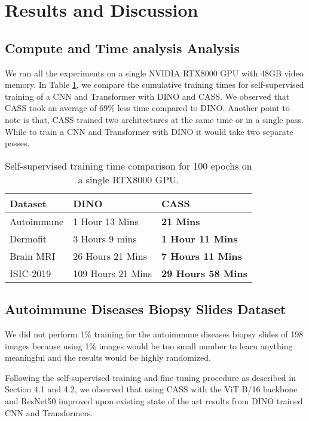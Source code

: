 \section{Results and Discussion}


\subsection{Compute and Time analysis Analysis}

We ran all the experiments on a single NVIDIA
RTX8000 GPU with 48GB video memory. In Table \ref{computetime}, we compare the cumulative training times for self-supervised training of a CNN and Transformer with DINO and CASS. We observed that CASS took an average of 69\% less time compared to DINO. Another point to note is that, CASS trained two architectures at the same time or in a single pass. While to train a CNN and Transformer with DINO it would take two separate passes.

\begin{table}[!htb]
\centering
\begin{tabular}{lll}
\hline
Dataset    & DINO              & CASS                    \\
\hline
Autoimmune & 1 Hour 13 Mins    & \textbf{21 Mins}          \\
Dermofit & 3 Hours 9 mins & \textbf{1 Hour 11 Mins} \\
Brain MRI  & 26 Hours 21 Mins  & \textbf{7 Hours 11 Mins}  \\
ISIC-2019  & 109 Hours 21 Mins & \textbf{29 Hours 58 Mins} \\
\hline
\end{tabular}
\caption{Self-supervised training time comparison for 100 epochs on a single RTX8000 GPU.}
\label{computetime}
\end{table}

\subsection{Autoimmune Diseases Biopsy Slides Dataset}
We did not perform 1\% training for the autoimmune diseases biopsy slides of 198 images because using 1\% images would be too small number to learn anything meaningful and the results would be highly randomized.

Following the self-supervised training and fine tuning procedure as described in Section 4.1 and 4.2, we observed that using CASS with the ViT B/16 backbone and ResNet50 improved upon existing state of the art results from DINO trained CNN and Transformers. 



